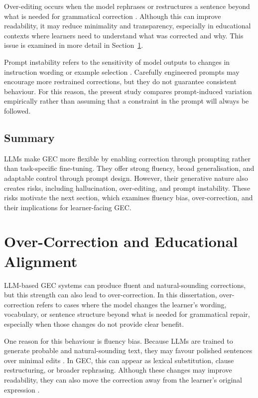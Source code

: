 Over-editing occurs when the model rephrases or restructures a sentence beyond what is needed for grammatical correction \cite{loem2023exploringeffectivenessgpt3grammatical}. Although this can improve readability, it may reduce minimality and transparency, especially in educational contexts where learners need to understand what was corrected and why. This issue is examined in more detail in Section~\ref{sec:over-correction}.

Prompt instability refers to the sensitivity of model outputs to changes in instruction wording or example selection \cite{liu2023pretrain}. Carefully engineered prompts may encourage more restrained corrections, but they do not guarantee consistent behaviour. For this reason, the present study compares prompt-induced variation empirically rather than assuming that a constraint in the prompt will always be followed.

\subsection*{Summary}

LLMs make GEC more flexible by enabling correction through prompting rather than task-specific fine-tuning. They offer strong fluency, broad generalisation, and adaptable control through prompt design. However, their generative nature also creates risks, including hallucination, over-editing, and prompt instability. These risks motivate the next section, which examines fluency bias, over-correction, and their implications for learner-facing GEC.

\section{Over-Correction and Educational Alignment}
\label{sec:over-correction}

LLM-based GEC systems can produce fluent and natural-sounding corrections, but this strength can also lead to over-correction. In this dissertation, over-correction refers to cases where the model changes the learner's wording, vocabulary, or sentence structure beyond what is needed for grammatical repair, especially when those changes do not provide clear benefit.

One reason for this behaviour is fluency bias. Because LLMs are trained to generate probable and natural-sounding text, they may favour polished sentences over minimal edits \cite{NEURIPS2020_1457c0d6,NIPS2017_3f5ee243}. In GEC, this can appear as lexical substitution, clause restructuring, or broader rephrasing. Although these changes may improve readability, they can also move the correction away from the learner's original expression \cite{loem2023exploringeffectivenessgpt3grammatical}.

